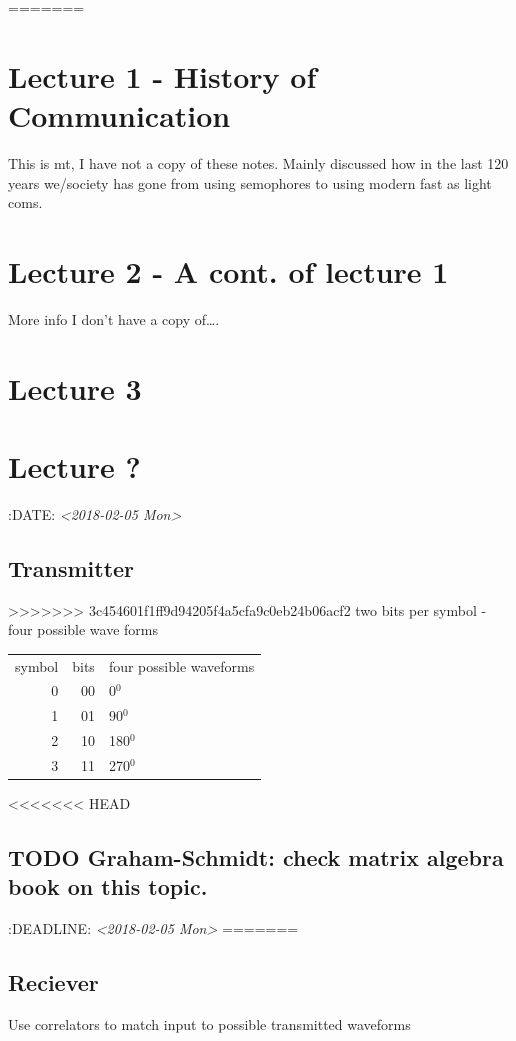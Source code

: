 \documentclass[11pt]{article}
\begin{document}
=======
\section{Lecture 1 - History of Communication}
\label{sec-1}
This is mt, I have not a copy of these notes. Mainly discussed how in the last 120 years we/society has gone from using semophores to using modern fast as light coms.
\section{Lecture 2 - A cont. of lecture 1}
\label{sec-2}
More info I don't have a copy of\ldots{}.
\section{Lecture 3}
\label{sec-3}

\section{Lecture ?}
\label{sec-4}
:DATE: \textit{<2018-02-05 Mon>}



\subsection{Transmitter}
\label{sec-4-1}
>>>>>>> 3c454601f1ff9d94205f4a5cfa9c0eb24b06acf2
two bits per symbol - four possible wave forms
\begin{center}
\begin{tabular}{rrl}
symbol & bits & four possible waveforms\\
0 & 00 & 0$^{\text{0}}$\\
1 & 01 & 90$^{\text{0}}$\\
2 & 10 & 180$^{\text{0}}$\\
3 & 11 & 270$^{\text{0}}$\\
\end{tabular}
\end{center}

<<<<<<< HEAD
\subsection{{\bfseries\sffamily TODO} Graham-Schmidt: check matrix algebra book on this topic.}
\label{sec-1-3}
:DEADLINE: \textit{<2018-02-05 Mon>}
=======
\subsection{Reciever}
\label{sec-4-2}
Use correlators to match input to possible transmitted waveforms
\end{document}

